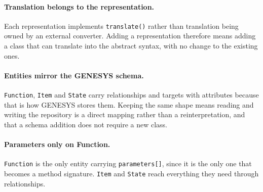 \paragraph{Translation belongs to the representation.}
Each representation implements \texttt{translate()} rather than translation
being owned by an external converter. Adding a representation therefore means
adding a class that can translate into the abstract syntax, with no change to
the existing ones.

\paragraph{Entities mirror the GENESYS schema.}
\texttt{Function}, \texttt{Item} and \texttt{State} carry relationships and
targets with attributes because that is how GENESYS stores them. Keeping the
same shape means reading and writing the repository is a direct mapping rather
than a reinterpretation, and that a schema addition does not require a new
class.

\paragraph{Parameters only on Function.}
\texttt{Function} is the only entity carrying \texttt{parameters[]}, since it is
the only one that becomes a method signature. \texttt{Item} and \texttt{State}
reach everything they need through relationships.
